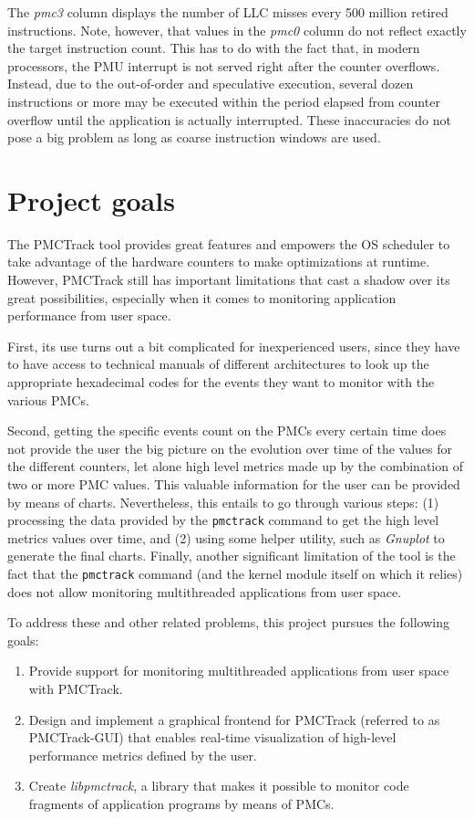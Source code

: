 The \textit{pmc3} column displays the number of LLC misses every 500
million retired instructions. Note, however, that values in the
\textit{pmc0} column do not reflect exactly the target instruction
count. This has to do with the fact that, in modern processors, the PMU
interrupt is not served right after the counter overflows. Instead, due
to the out-of-order and speculative execution, several dozen
instructions or more may be executed within the period elapsed from
counter overflow until the application is actually interrupted. These
inaccuracies do not pose a big problem as long as coarse instruction
windows are used.

\section{Project goals}\label{project-goals}

The PMCTrack tool provides great features and empowers the OS scheduler
to take advantage of the hardware counters to make optimizations at
runtime. However, PMCTrack still has important limitations that cast a
shadow over its great possibilities, especially when it comes to monitoring application performance from user space.

First, its use turns out a bit complicated for inexperienced
users, since they have to have access to technical manuals of different
architectures to look up the appropriate hexadecimal codes for the events they want to monitor with the various PMCs.

Second, getting the specific events count on the PMCs every certain
time does not provide the user the big picture on the evolution over time of the values for the different counters, let alone high level metrics made up by the
combination of two or more PMC values. This valuable information for the
user can be provided by means of charts. Nevertheless, this entails to go through various steps: (1) processing the data provided by the \texttt{pmctrack} command to
get the high level metrics values over time, and (2) using some helper utility, such as \emph{Gnuplot} to generate the final charts. Finally, another significant limitation of the tool is the fact that the \texttt{pmctrack} command (and the kernel module itself on which it relies) does not allow monitoring multithreaded applications from user space.

To address these and other related problems, this project pursues the following goals:

\begin{enumerate}
\def\labelenumi{\arabic{enumi}.}
\item
  Provide support for monitoring multithreaded applications
  from user space with PMCTrack.
\item
  Design and implement a graphical frontend for PMCTrack (referred to as 
  PMCTrack-GUI) that enables real-time visualization of high-level performance metrics defined by the user.
\item
  Create \emph{libpmctrack}, a library that makes it possible to monitor code fragments of application programs by means of PMCs.
\end{enumerate}

